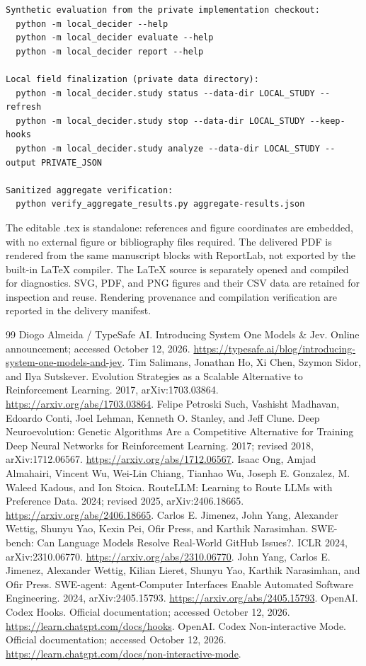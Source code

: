 \documentclass[11pt]{article}
\begin{document}
\begin{verbatim}
Synthetic evaluation from the private implementation checkout:
  python -m local_decider --help
  python -m local_decider evaluate --help
  python -m local_decider report --help

Local field finalization (private data directory):
  python -m local_decider.study status --data-dir LOCAL_STUDY --refresh
  python -m local_decider.study stop --data-dir LOCAL_STUDY --keep-hooks
  python -m local_decider.study analyze --data-dir LOCAL_STUDY --output PRIVATE_JSON

Sanitized aggregate verification:
  python verify_aggregate_results.py aggregate-results.json
\end{verbatim}
The editable .tex is standalone: references and figure coordinates are embedded, with no external figure or bibliography files required. The delivered PDF is rendered from the same manuscript blocks with ReportLab, not exported by the built-in LaTeX compiler. The LaTeX source is separately opened and compiled for diagnostics. SVG, PDF, and PNG figures and their CSV data are retained for inspection and reuse. Rendering provenance and compilation verification are reported in the delivery manifest.

\begin{thebibliography}{99}
Diogo Almeida / TypeSafe AI. Introducing System One Models \& Jev. Online announcement; accessed October 12, 2026. \url{https://typesafe.ai/blog/introducing-system-one-models-and-jev}.
Tim Salimans, Jonathan Ho, Xi Chen, Szymon Sidor, and Ilya Sutskever. Evolution Strategies as a Scalable Alternative to Reinforcement Learning. 2017, arXiv:1703.03864. \url{https://arxiv.org/abs/1703.03864}.
Felipe Petroski Such, Vashisht Madhavan, Edoardo Conti, Joel Lehman, Kenneth O. Stanley, and Jeff Clune. Deep Neuroevolution: Genetic Algorithms Are a Competitive Alternative for Training Deep Neural Networks for Reinforcement Learning. 2017; revised 2018, arXiv:1712.06567. \url{https://arxiv.org/abs/1712.06567}.
Isaac Ong, Amjad Almahairi, Vincent Wu, Wei-Lin Chiang, Tianhao Wu, Joseph E. Gonzalez, M. Waleed Kadous, and Ion Stoica. RouteLLM: Learning to Route LLMs with Preference Data. 2024; revised 2025, arXiv:2406.18665. \url{https://arxiv.org/abs/2406.18665}.
Carlos E. Jimenez, John Yang, Alexander Wettig, Shunyu Yao, Kexin Pei, Ofir Press, and Karthik Narasimhan. SWE-bench: Can Language Models Resolve Real-World GitHub Issues?. ICLR 2024, arXiv:2310.06770. \url{https://arxiv.org/abs/2310.06770}.
John Yang, Carlos E. Jimenez, Alexander Wettig, Kilian Lieret, Shunyu Yao, Karthik Narasimhan, and Ofir Press. SWE-agent: Agent-Computer Interfaces Enable Automated Software Engineering. 2024, arXiv:2405.15793. \url{https://arxiv.org/abs/2405.15793}.
OpenAI. Codex Hooks. Official documentation; accessed October 12, 2026. \url{https://learn.chatgpt.com/docs/hooks}.
OpenAI. Codex Non-interactive Mode. Official documentation; accessed October 12, 2026. \url{https://learn.chatgpt.com/docs/non-interactive-mode}.
\end{thebibliography}
\end{document}

